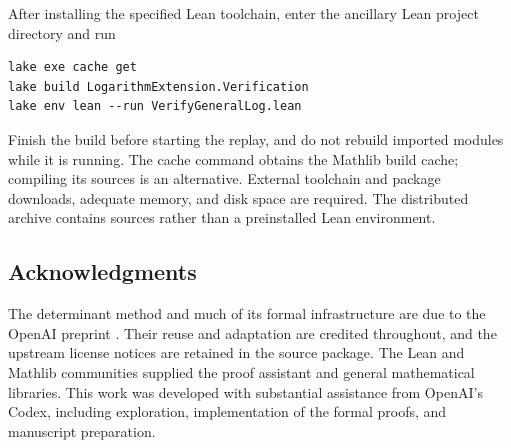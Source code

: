 After installing the specified Lean toolchain, enter the ancillary
Lean project directory and run
\begin{Verbatim}[fontsize=\small]
lake exe cache get
lake build LogarithmExtension.Verification
lake env lean --run VerifyGeneralLog.lean
\end{Verbatim}
Finish the build before starting the replay, and do not rebuild
imported modules while it is running.
The cache command obtains the Mathlib build cache; compiling its
sources is an alternative.
External toolchain and package downloads, adequate memory, and disk
space are required. The distributed archive contains sources rather
than a preinstalled Lean environment.

\subsection*{Acknowledgments}

The determinant method and much of its formal infrastructure are due
to the OpenAI preprint \cite{OAIpi}. Their reuse and adaptation are
credited throughout, and the upstream license notices are retained
in the source package.
The Lean and Mathlib communities supplied the proof assistant and
general mathematical libraries.
This work was developed with substantial assistance from OpenAI's
Codex, including exploration, implementation of the formal proofs,
and manuscript preparation.
